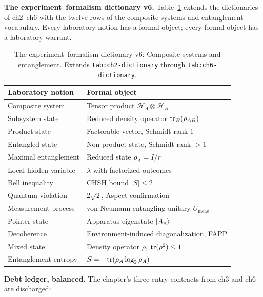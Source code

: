 \medskip\noindent\textbf{The experiment--formalism dictionary v6.}
Table~\ref{tab:ch7-dictionary} extends the dictionaries of ch2--ch6 with the twelve rows of the composite-systems and entanglement vocabulary. Every laboratory notion has a formal object; every formal object has a laboratory warrant.

\begin{table}[htbp]
\centering
\caption{The experiment--formalism dictionary v6: Composite systems and entanglement. Extends \texttt{tab:ch2-dictionary} through \texttt{tab:ch6-dictionary}.}
\label{tab:ch7-dictionary}
\begin{tabular}{@{}ll@{}}
\toprule
Laboratory notion & Formal object \\
\midrule
Composite system & Tensor product $\mathcal{H}_A \otimes \mathcal{H}_B$ \\
Subsystem state & Reduced density operator $\mathrm{tr}_B(\rho_{AB})$ \\
Product state & Factorable vector, Schmidt rank $1$ \\
Entangled state & Non-product state, Schmidt rank $> 1$ \\
Maximal entanglement & Reduced state $\rho_A = I/r$ \\
Local hidden variable & $\lambda$ with factorized outcomes \\
Bell inequality & CHSH bound $\lvert S\rvert \le 2$ \\
Quantum violation & $2\sqrt{2}$, Aspect confirmation \\
Measurement process & von Neumann entangling unitary $U_{\text{meas}}$ \\
Pointer state & Apparatus eigenstate $\ket{A_n}$ \\
Decoherence & Environment-induced diagonalization, FAPP \\
Mixed state & Density operator $\rho$, $\mathrm{tr}(\rho^2) \le 1$ \\
Entanglement entropy & $S = -\mathrm{tr}(\rho_A\log_2\rho_A)$ \\
\bottomrule
\end{tabular}
\end{table}

\medskip\noindent\textbf{Debt ledger, balanced.}
The chapter's three entry contracts from ch3 and ch6 are discharged:

